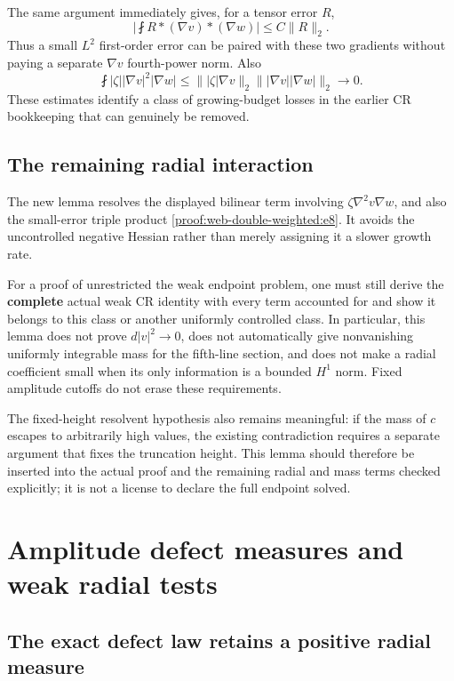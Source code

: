 The same argument immediately gives, for a tensor error \(R\), \[
\left|\fint R*(\nabla v)*(\nabla w)\right|
\le C\|R\|_2.
\tag{\thesection.8}\label{proof:web-double-weighted:e8}
\] Thus a small \(L^2\) first-order error can be paired with these two gradients without paying a separate \(\nabla v\) fourth-power norm. Also \[
\fint |\zeta||\nabla v|^2|\nabla w|
\le \||\zeta|\nabla v\|_2
     \||\nabla v||\nabla w|\|_2
\to0.
\tag{\thesection.9}\label{proof:web-double-weighted:e9}
\] These estimates identify a class of growing-budget losses in the earlier CR bookkeeping that can genuinely be removed.

\hypertarget{proof:web-double-weighted:s6}{%
\subsection{The remaining radial interaction}\label{proof:web-double-weighted:s6}}

The new lemma resolves the displayed bilinear term involving \(\zeta\nabla^2v\nabla w\), and also the small-error triple product \eqref{proof:web-double-weighted:e8}. It avoids the uncontrolled negative Hessian rather than merely assigning it a slower growth rate.

For a proof of unrestricted the weak endpoint problem, one must still derive the \textbf{complete} actual weak CR identity with every term accounted for and show it belongs to this class or another uniformly controlled class. In particular, this lemma does not prove \(d|v|^2\to0\), does not automatically give nonvanishing uniformly integrable mass for the fifth-line section, and does not make a radial coefficient small when its only information is a bounded \(H^1\) norm. Fixed amplitude cutoffs do not erase these requirements.

The fixed-height resolvent hypothesis also remains meaningful: if the mass of \(c\) escapes to arbitrarily high values, the existing contradiction requires a separate argument that fixes the truncation height. This lemma should therefore be inserted into the actual proof and the remaining radial and mass terms checked explicitly; it is not a license to declare the full endpoint solved.


\section{Amplitude defect measures and weak radial tests}
\label{sec:web-radial-measure}
\hypertarget{proof:web-radial-measure:s2}{%
\subsection{The exact defect law retains a positive radial measure}\label{proof:web-radial-measure:s2}}

